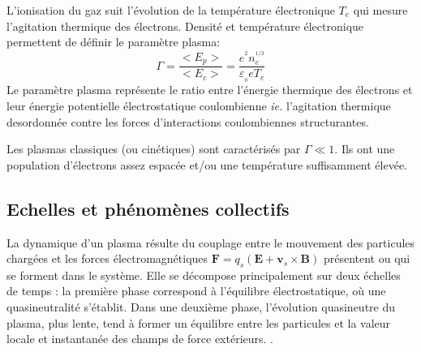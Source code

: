 L'ionisation du gaz suit l'évolution de la température électronique $T_e$ qui
mesure l'agitation thermique des électrons. Densité et température
électronique permettent de définir le paramètre plasma:
\begin{equation}
\label{1-paramPlasma}
\Gamma=\frac{<E_p>}{<E_c>}=\frac{e^{^2}n_e^{^{1/3}}}{\varepsilon_{_0}
eT_e}
\end{equation}
Le paramètre plasma représente le ratio entre l'énergie thermique des
électrons et leur énergie potentielle électrostatique coulombienne \emph{ie.}
l'agitation thermique desordonnée contre les forces d'interactions
coulombiennes structurantes.

Les plasmas classiques (ou cinétiques) sont caractérisés par
$\Gamma\ll 1$. Ils ont une population d'électrons assez espacée et/ou une
température suffisamment élevée.

\subsection{Echelles et phénomènes collectifs}
La dynamique d'un plasma résulte du couplage entre le mouvement des
particules chargées et les forces électromagnétiques $\mathbf
F=q_s(\mathbf E+ \mathbf v_s\times\mathbf B)$
présentent ou qui se forment dans le système.
Elle se décompose principalement sur deux échelles de temps : la première
phase correspond à l'équilibre électrostatique, où une
quasineutralité s'établit. Dans une deuxième phase, l'évolution quasineutre du
plasma, plus lente, tend à former un équilibre entre les particules et la valeur locale
et instantanée des champs de force extérieurs.
.
